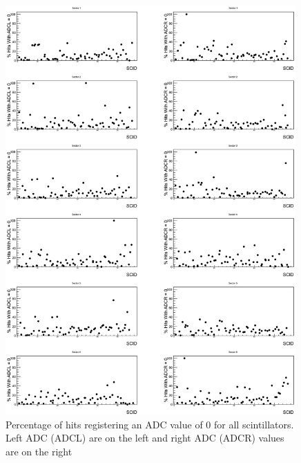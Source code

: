 \begin{figure}[!htbp]
    \includegraphics[width=0.99\textwidth]{figures/calib/tof/tofko/adc.eps}
    \caption{Percentage of hits registering an ADC value of 0 for all scintillators. Left ADC (ADCL) are on the left and right ADC (ADCR) values are on the right}
    \label{plt:adc0vSCID}
\end{figure}

